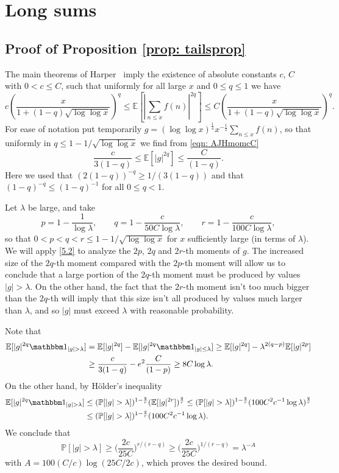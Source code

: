 \documentclass[12pt, notitlepage]{amsart}
\numberwithin{equation}{section}
\def\P{\mathbb P}
\def\E{\mathbb E}
\theoremstyle{remark}
\theoremstyle{definition}
\theoremstyle{remark}
\numberwithin{equation}{section}
\begin{document}
 

  \section{Long sums}\label{SEC: LONG SUM}

\subsection{Proof of Proposition \ref{prop: tailsprop}}  The main theorems of Harper~\cite{HarperLow} imply the existence of 
absolute constants $c$, $C$ with  $0 < c \leq C$, such that uniformly for all large $x$ and $0 \leq q \leq 1$ we have
\begin{equation}\label{eqn: AJHmomcC}
c \left( \frac{x}{1 + (1-q)\sqrt{\log\log x}} \right)^q \leq \E[|\sum_{n \leq x} f(n)|^{2q}] \leq C \left( \frac{x}{1 + (1-q)\sqrt{\log\log x}} \right)^q .
\end{equation}
For ease of notation put temporarily $g= (\log \log x)^{\frac 14} x^{-\frac 12} \sum_{n\le x} f(n)$, so that uniformly in $q\le 1- 1/\sqrt{\log \log x}$ we find from \eqref{eqn: AJHmomcC} 
\begin{equation} 
\label{5.2} 
\frac {c}{3(1-q)} \le \E [|g|^{2q}] \le \frac{C}{(1-q)}. 
\end{equation} 
Here we used that $(2(1-q))^{-q} \ge 1/(3(1-q))$ and that $(1-q)^{-q} \le(1-q)^{-1}$ for all $0\le q<1$.  

Let $\lambda$ be large, and take 
$$ 
p = 1-\frac{1}{\log \lambda}, \qquad q = 1- \frac{c}{50 C \log \lambda}, \qquad r= 1- \frac{c}{100 C \log \lambda}, 
$$ 
so that $0< p < q < r \le 1- 1/\sqrt{\log \log x}$ for $x$ sufficiently large (in terms of $\lambda$).  We will apply \eqref{5.2} to analyze the $2p$, $2q$ and $2r$-th moments of $g$. The increased size of the $2q$-th moment compared with the $2p$-th moment will allow us to conclude that a large portion of the $2q$-th moment must be produced by values $|g| > \lambda$. On the other hand, the fact that the $2r$-th moment isn't too much bigger than the $2q$-th will imply that this size isn't all produced by values much larger than $\lambda$, and so $|g|$ must exceed $\lambda$ with reasonable probability.

Note that 
\begin{align*}
\E[ |g|^{2q} {\mathbbm 1}_{|g|>\lambda}] &= \E[|g|^{2q}] - \E[|g|^{2q} {\mathbbm 1}_{|g| \le \lambda}] \ge \E[|g|^{2q}] - \lambda^{2(q-p)} \E [ |g|^{2p}] \\
&\ge \frac{c}{3(1-q)} - e^2 \frac{C}{(1-p)} \ge 8C \log \lambda. 
\end{align*} 
On the other hand, by H{\" o}lder's inequality 
\begin{align*}
\E[ |g|^{2q} {\mathbbm 1}_{|g|>\lambda}] &\le (\P[|g| >\lambda])^{1- \frac{q}{r}} (\E[|g|^{2r}])^{\frac qr} \le (\P[|g| >\lambda])^{1- \frac{q}{r}} (100C^2 c^{-1} \log \lambda)^{\frac qr} 
\\
&\le  (\P[|g| >\lambda])^{1- \frac{q}{r}} (100C^2 c^{-1} \log \lambda) . 
\end{align*} 
We conclude that 
$$ 
\P[|g| >\lambda] \ge \Big( \frac{2c}{25C}\Big)^{r/(r-q)} \ge \Big( \frac{2c}{25C}\Big)^{1/(r-q)} = \lambda^{-A} 
$$
with $A = 100(C/c) \log (25C/2c)$, which proves the desired bound.  
\end{document}
